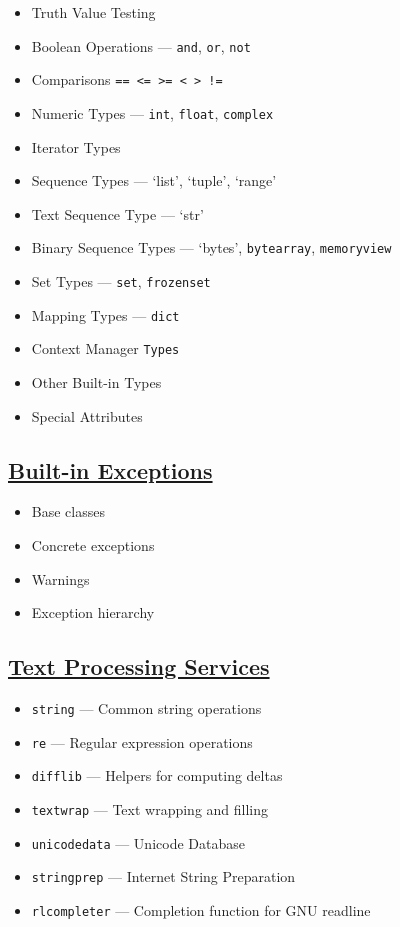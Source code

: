 \documentclass[]{book}
\providecommand{\tightlist}{%
  \setlength{\itemsep}{0pt}\setlength{\parskip}{0pt}}
\theoremstyle{definition}
\theoremstyle{definition}
\theoremstyle{definition}
\theoremstyle{remark}
\begin{document}
\begin{itemize}
\tightlist
\item
  Truth Value Testing
\item
  Boolean Operations --- \texttt{and}, \texttt{or}, \texttt{not}
\item
  Comparisons
  \texttt{==\ \textless{}=\ \textgreater{}=\ \textless{}\ \textgreater{}\ !=}
\item
  Numeric Types --- \texttt{int}, \texttt{float}, \texttt{complex}
\item
  Iterator Types
\item
  Sequence Types --- `list', `tuple', `range'
\item
  Text Sequence Type --- `str'
\item
  Binary Sequence Types --- `bytes', \texttt{bytearray},
  \texttt{memoryview}
\item
  Set Types --- \texttt{set}, \texttt{frozenset}
\item
  Mapping Types --- \texttt{dict}
\item
  Context Manager \texttt{Types}
\item
  Other Built-in Types
\item
  Special Attributes
\end{itemize}

\subsection{\texorpdfstring{\href{https://docs.python.org/3.7/library/exceptions.html}{Built-in
Exceptions}}{Built-in Exceptions}}\label{built-in-exceptions}

\begin{itemize}
\tightlist
\item
  Base classes
\item
  Concrete exceptions
\item
  Warnings
\item
  Exception hierarchy
\end{itemize}

\subsection{\texorpdfstring{\href{https://docs.python.org/3.7/library/text.html}{Text
Processing
Services}}{Text Processing Services}}\label{text-processing-services}

\begin{itemize}
\tightlist
\item
  \texttt{string} --- Common string operations
\item
  \texttt{re} --- Regular expression operations
\item
  \texttt{difflib} --- Helpers for computing deltas
\item
  \texttt{textwrap} --- Text wrapping and filling
\item
  \texttt{unicodedata} --- Unicode Database
\item
  \texttt{stringprep} --- Internet String Preparation
\item
  \texttt{rlcompleter} --- Completion function for GNU readline
\end{itemize}
\end{document}
